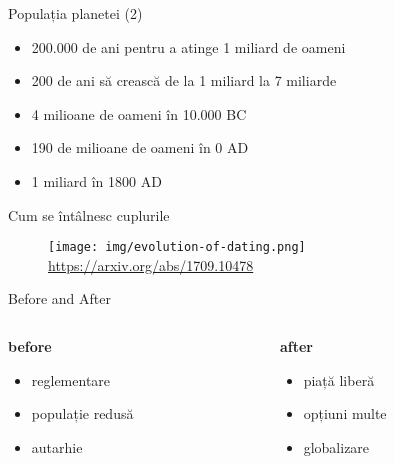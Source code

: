 \documentclass{simple}
\begin{document}
\begin{frame}{Populația planetei (2)}
  \begin{itemize}
    \pause
    \item 200.000 de ani pentru a atinge 1 miliard de oameni
    \pause
    \item 200 de ani să crească de la 1 miliard la 7 miliarde
    \pause
    \item 4 milioane de oameni în 10.000 BC
    \pause
    \item 190 de milioane de oameni în 0 AD
    \pause
    \item 1 miliard în 1800 AD
  \end{itemize}
\end{frame}

\begin{frame}{Cum se întâlnesc cuplurile}
  \begin{figure}[!htbp]
    \centering
    \texttt{[image: img/evolution-of-dating.png]} \\
    \tiny{\url{https://arxiv.org/abs/1709.10478}}
  \end{figure}
\end{frame}

\begin{frame}{Before and After}
  \begin{columns}
    \begin{column}{0.5\textwidth}
      \pause
      \textbf{before}
        \begin{itemize}
          \scriptsize
          \pause
          \item reglementare
          \pause
          \item populație redusă
          \pause
          \item autarhie
        \end{itemize}
    \end{column}
    \begin{column}{0.5\textwidth}
      \pause
      \textbf{after}
        \begin{itemize}
          \scriptsize
          \pause
          \item piață liberă
          \pause
          \item opțiuni multe
          \pause
          \item globalizare
        \end{itemize}
    \end{column}
  \end{columns}
\end{frame}
\end{document}
